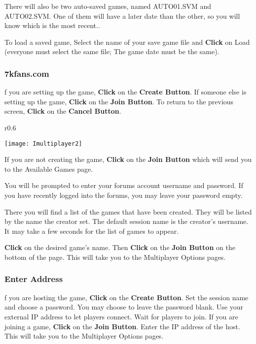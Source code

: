 There will also be two auto-saved games, named AUTO01.SVM and AUTO02.SVM. One of them will have a later date than the other, so you will know which is the most recent..

To load a saved game, Select the name of your save game file and \textbf{Click} on Load (everyone must select the same file; The game date must be the same).

\subsubsection{7kfans.com} %


f you are setting up the game, \textbf{Click} on the \textbf{Create Button}. If someone else is setting up the game, \textbf{Click} on the \textbf{Join Button}. To return to the previous screen, \textbf{Click} on the \textbf{Cancel Button}.

\begin{wrapfigure}{r}{0.6\textwidth}
	\begin{center}
		\vspace{-20pt}
		\texttt{[image: Imultiplayer2]} %
	\end{center}
	\vspace{-20pt}
\end{wrapfigure}

If you are not creating the game, \textbf{Click} on the \textbf{Join Button} which will send you to the Available Games page.

You will be prompted to enter your forums account username and password. If you have recently logged into the forums, you may leave your password empty.

There you will find a list of the games that have been created. They will be listed by the name the creator set. The default session name is the creator’s username. It may take a few seconds for the list of games to appear.

\textbf{Click} on the desired game’s name. Then \textbf{Click} on the \textbf{Join Button} on the bottom of the page. This will take you to the Multiplayer Options pages.

\subsubsection{Enter Address}

f you are hosting the game, \textbf{Click} on the \textbf{Create Button}. Set the session name and choose a password. You may choose to leave the password blank. Use your external IP address to let players connect. Wait for players to join. If you are joining a game, \textbf{Click} on the \textbf{Join Button}. Enter the IP address of the host. This will take you to the Multiplayer Options pages.

